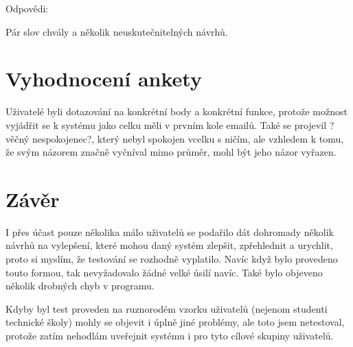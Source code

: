 \begin{bf}Odpovědi:\end{bf} Pár slov chvály a několik neuskutečnitelných návrhů.

\vspace{10pt}

\section{Vyhodnocení ankety}

Uživatelé byli dotazování na konkrétní body a konkrétní funkce, protože možnost vyjádřit se k systému jako celku měli v prvním kole emailů. Také se projevil ?věčný nespokojenec?, který nebyl spokojen vcelku s ničím, ale vzhledem k tomu, že svým názorem značně vyčníval mimo průměr, mohl být jeho názor vyřazen.

\vspace{10pt}

\section{Závěr}

I přes účast pouze několika málo uživatelů se podařilo dát dohromady několik návrhů na vylepšení, které mohou daný systém zlepšit, zpřehlednit a urychlit, proto si myslím, že testování se rozhodně vyplatilo. Navíc když bylo provedeno touto formou, tak nevyžadovalo žádné velké úsilí navíc. Také bylo objeveno několik drobných chyb v programu.

\vspace{10pt}

Kdyby byl test proveden na ruznorodém vzorku uživatelů (nejenom studenti technické školy) mohly se objevit i úplně jiné problémy, ale toto jsem netestoval, protože zatím nehodlám uveřejnit systému i pro tyto cílové skupiny uživatelů.
